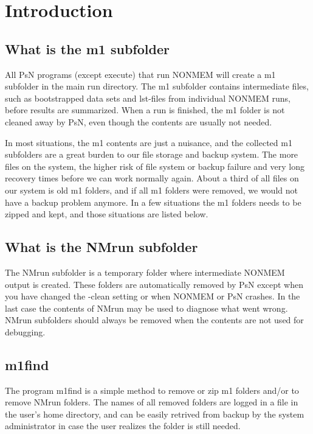 \documentclass[a4wide,12pt]{article}
\date{#1}
\title{#1\\ }
\date{Revised #2}
\title{#1}
\date{#2}
\renewcommand{\_}{\textscale{.7}{\textunderscore}}
\begin{document}
\maketitle
\newcommand{\guidetoolname}{m1find}


\section{Introduction}
\subsection{What is the m1 subfolder}
All PsN programs (except execute) that run NONMEM will create a m1 subfolder in
the main run directory. The m1 subfolder contains intermediate files,
such as bootstrapped data sets and lst-files from individual NONMEM runs, before
results are summarized. When a run is finished, the m1 folder is not cleaned
away by PsN, even though the contents are usually not needed.

In most situations,
the m1 contents are just a nuisance, and the collected m1 subfolders
are a great burden to our file storage and backup system. The more files on
the system, the higher risk of file system or backup failure
and very long recovery times before we can work normally again.
About a third of all files on our system is old m1 folders, 
and if all
m1 folders were removed, we would not have a backup problem anymore.
In a few situations the m1 folders needs to be zipped and kept,
and those situations
are listed below.

\subsection{What is the NM\_run subfolder}
The NM\_run subfolder is a temporary folder where intermediate NONMEM output is created.
These folders are automatically removed by PsN except when you have changed the -clean setting or
when NONMEM or PsN crashes.
In the last case the contents of NM\_run may be used to diagnose what went wrong.
NM\_run subfolders should always be removed when the contents are not used for debugging.

\subsection{m1find}
The program m1find is a simple method to remove or zip m1 folders and/or to remove NM\_run folders. 
The names of all removed folders are logged in a file in the user's home directory,
and can be easily retrived from backup by the system administrator in case the
user realizes the folder is still needed.
\end{document}

